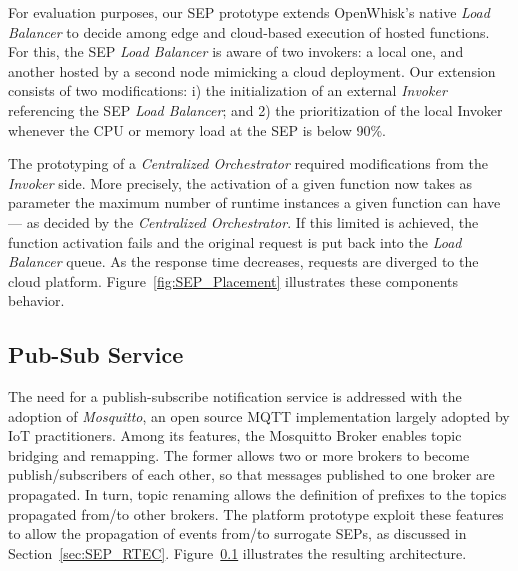 

For evaluation purposes, our SEP prototype extends OpenWhisk's native \textit{Load Balancer} to decide among edge and cloud-based execution of hosted functions. For this, the SEP \textit{Load Balancer} is aware of two invokers: a local one, and another hosted by a second node mimicking a cloud deployment. Our extension consists of two modifications: i) the initialization of an external \textit{Invoker} referencing the SEP \textit{Load Balancer}; and 2) the prioritization of the local Invoker whenever the CPU or memory load at the SEP is below 90\%. 

The prototyping of a \textit{Centralized Orchestrator} required modifications from the \textit{Invoker} side. More precisely, the activation of a given function now takes as parameter the maximum number of runtime instances a given function can have --- as decided by the \textit{Centralized Orchestrator}. If this limited is achieved, the function activation fails and the original request is put back into the \textit{Load Balancer} queue. As the response time decreases, requests are diverged to the cloud platform. Figure~\ref{fig:SEP_Placement} illustrates these components behavior.




\subsection{Pub-Sub Service}


The need for a publish-subscribe notification service is addressed with the adoption of \textit{Mosquitto}, an open source MQTT implementation largely adopted by IoT practitioners. %
Among its features, the Mosquitto Broker enables topic bridging and remapping. The former allows two or more brokers to become publish/subscribers of each other, so that messages published to one broker are propagated. In turn, topic renaming allows the definition of prefixes to the topics propagated from/to other brokers. The platform prototype exploit these features to allow the propagation of events from/to surrogate SEPs, as discussed in Section~\ref{sec:SEP_RTEC}. Figure~\ref{} illustrates the resulting architecture.

